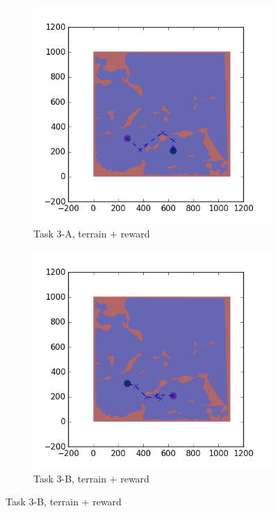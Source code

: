 \documentclass{tamuccthesis}
\begin{document}
\begin{figure}
    \begin{subfigure}[b]{0.4\textwidth}
        \centering
        \includegraphics[width=\textwidth,trim={4cm 3cm 2cm 3cm},clip]{EXP3RG_PathCa_-1_-1_0_-1.png}
        \caption[]{{\small Task 3-A, terrain + reward}}    
        \label{fig:Path_3-A_terrain_reward}
    \end{subfigure}
    \hfill
    \begin{subfigure}[b]{0.4\textwidth}  
        \centering 
        \includegraphics[width=\textwidth,trim={4cm 3cm 2cm 3cm},clip]{EXP3RG_PathCb_-1_-1_0_-1.png}
        \caption[]{{\small Task 3-B, terrain + reward}}   
        \label{fig:Path_3-B_terrain_reward}
    \end{subfigure}
    

\end{figure}
\end{document}
